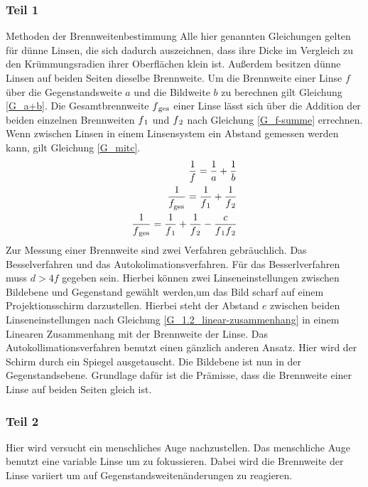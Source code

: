 \documentclass[a4paper, 12pt]{article}
\begin{document}
\subsubsection{Teil 1}
	Methoden der Brennweitenbestimmung
Alle hier genannten Gleichungen gelten für dünne Linsen, die sich dadurch auszeichnen, dass ihre Dicke im Vergleich zu den Krümmungsradien ihrer Oberflächen klein ist. Außerdem besitzen dünne Linsen auf beiden Seiten dieselbe Brennweite. Um die Brennweite einer Linse $f$ über die Gegenstandsweite $a$ und die Bildweite $b$ zu berechnen gilt Gleichung \ref{G_a+b}. Die Gesamtbrennweite $f\textsubscript{ges}$ einer Linse lässt sich über die Addition der beiden einzelnen Brennweiten $f\textsubscript{1}$ und $f\textsubscript{2}$ nach Gleichung \ref{G_f-summe} errechnen. Wenn zwischen Linsen in einem Linsensystem ein Abstand gemessen werden kann, gilt Gleichung \ref{G_mitc}.
	\begin{eqnarray}
	\frac{1}{f}=\frac{1}{a}+\frac{1}{b} \label{G_a+b}\\
	\frac{1}{f_\textsubscript{ges}}=\frac{1}{f\textsubscript{1}}+\frac{1}{f\textsubscript{2}} \label{G_f-summe}\\
	\frac{1}{f\textsubscript{ges}}=\frac{1}{f\textsubscript{1}}+\frac{1}{f\textsubscript{2}}-\frac{c}{f\textsubscript{1}f\textsubscript{2}} 	\label{G_mitc}
	\end{eqnarray}
Zur Messung einer Brennweite sind zwei Verfahren gebräuchlich. Das Besselverfahren und das Autokolimationsverfahren. Für das Besserlverfahren muss $d>4f$ gegeben sein. Hierbei können zwei Linseneinstellungen zwischen Bildebene und Gegenstand gewählt werden,um das Bild scharf auf einem Projektionsschirm darzustellen. Hierbei steht der Abstand $e$ zwischen beiden Linseneinstellungen nach Gleichung \ref{G_1.2_linear-zusammenhang} in einem Linearen Zusammenhang mit der Brennweite der Linse. Das Autokollimationsverfahren benutzt einen gänzlich anderen Ansatz. Hier wird der Schirm durch ein Spiegel ausgetauscht. Die Bildebene ist nun in der Gegenstandsebene. Grundlage dafür ist die Prämisse, dass die Brennweite einer Linse auf beiden Seiten gleich ist.

\subsubsection{Teil 2}
	Hier wird versucht ein menschliches Auge nachzustellen. Das menschliche Auge benutzt eine variable Linse um zu fokussieren. Dabei wird die Brennweite der Linse variiert um auf Gegenstandsweitenänderungen zu reagieren.
		
\end{document}
